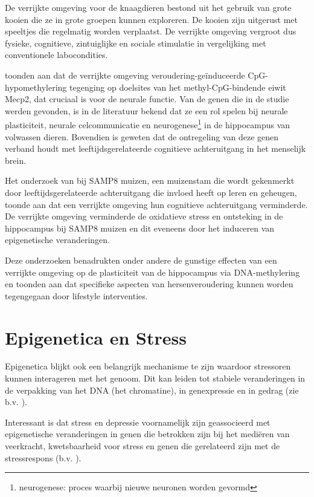 \documentclass[
  11pt,
]{book}
\begin{document}
De verrijkte omgeving voor de knaagdieren bestond uit het gebruik van grote kooien die ze in grote groepen kunnen exploreren. De kooien zijn uitgerust met speeltjes die regelmatig worden verplaatst. De verrijkte omgeving vergroot dus fysieke, cognitieve, zintuiglijke en sociale stimulatie in vergelijking met conventionele labocondities.

\citet{zocher2021} toonden aan dat de verrijkte omgeving veroudering-geïnduceerde CpG-hypomethylering tegenging op doelsites van het methyl-CpG-bindende eiwit Mecp2, dat cruciaal is voor de neurale functie. Van de genen die in de studie werden gevonden, is in de literatuur bekend dat ze een rol spelen bij neurale plasticiteit, neurale celcommunicatie en neurogenese\footnote{neurogenese: proces waarbij nieuwe neuronen worden gevormd} in de hippocampus van volwassen dieren. Bovendien is geweten dat de ontregeling van deze genen verband houdt met leeftijdsgerelateerde cognitieve achteruitgang in het menselijk brein.

Het onderzoek van \citet{grinan2016} bij SAMP8 muizen, een muizenstam die wordt gekenmerkt door leeftijdsgerelateerde achteruitgang die invloed heeft op leren en geheugen, toonde aan dat een verrijkte omgeving hun cognitieve achteruitgang verminderde. De verrijkte omgeving verminderde de oxidatieve stress en ontsteking in de hippocampus bij SAMP8 muizen en dit eveneens door het induceren van epigenetische veranderingen.

Deze onderzoeken benadrukten onder andere de gunstige effecten van een verrijkte omgeving op de plasticiteit van de hippocampus via DNA-methylering en toonden aan dat specifieke aspecten van hersenveroudering kunnen worden tegengegaan door lifestyle interventies.

\section{Epigenetica en Stress}\label{epigenetica-en-stress}

Epigenetica blijkt ook een belangrijk mechanisme te zijn waardoor stressoren kunnen interageren met het genoom. Dit kan leiden tot stabiele veranderingen in de verpakking van het DNA (het chromatine), in genexpressie en in gedrag (zie b.v. \citet{Park2019}).

Interessant is dat stress en depressie voornamelijk zijn geassocieerd met epigenetische veranderingen in genen die betrokken zijn bij het mediëren van veerkracht, kwetsbaarheid voor stress en genen die gerelateerd zijn met de stressrespons (b.v. \citet{Park2019}).
\end{document}
